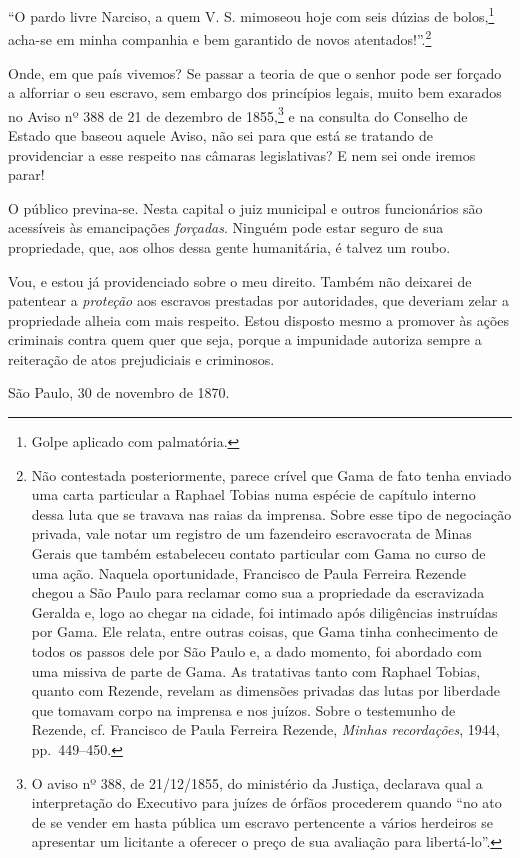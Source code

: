 {``O pardo livre Narciso, a quem V. S. mimoseou hoje com seis dúzias de
bolos,\footnote{ Golpe aplicado com palmatória.} acha-se em minha
companhia e bem garantido de novos atentados!''.\footnote{ Não
  contestada posteriormente, parece crível que Gama de fato tenha
  enviado uma carta particular a Raphael Tobias numa espécie de capítulo
  interno dessa luta que se travava nas raias da imprensa. Sobre esse
  tipo de negociação privada, vale notar um registro de um fazendeiro
  escravocrata de Minas Gerais que também estabeleceu contato particular
  com Gama no curso de uma ação. Naquela oportunidade, Francisco de
  Paula Ferreira Rezende chegou a São Paulo para reclamar como sua a
  propriedade da escravizada Geralda e, logo ao chegar na cidade, foi
  intimado após diligências instruídas por Gama. Ele relata, entre
  outras coisas, que Gama tinha conhecimento de todos os passos dele por
  São Paulo e, a dado momento, foi abordado com uma missiva de parte de
  Gama. As tratativas tanto com Raphael Tobias, quanto com Rezende,
  revelam as dimensões privadas das lutas por liberdade que tomavam
  corpo na imprensa e nos juízos. Sobre o testemunho de Rezende, cf.
  Francisco de Paula Ferreira Rezende, \emph{Minhas recordações}, 1944,
  pp.~449--450.}

Onde, em que país vivemos? Se passar a teoria de que o senhor pode ser
forçado a alforriar o seu escravo, sem embargo dos princípios legais,
muito bem exarados no Aviso nº 388 de 21 de dezembro de 1855,\footnote{
  O aviso nº 388, de 21/12/1855, do ministério da Justiça, declarava
  qual a interpretação do Executivo para juízes de órfãos procederem
  quando ``no ato de se vender em hasta pública um escravo pertencente a
  vários herdeiros se apresentar um licitante a oferecer o preço de sua
  avaliação para libertá-lo''.} e na consulta do Conselho de Estado que
baseou aquele Aviso, não sei para que está se tratando de providenciar a
esse respeito nas câmaras legislativas? E nem sei onde iremos parar!

O público previna-se. Nesta capital o juiz municipal e outros
funcionários são acessíveis às emancipações \emph{forçadas}. Ninguém
pode estar seguro de sua propriedade, que, aos olhos dessa gente
humanitária, é talvez um roubo.

Vou, e estou já providenciado sobre o meu direito. Também não deixarei
de patentear a \emph{proteção} aos escravos prestadas por autoridades,
que deveriam zelar a propriedade alheia com mais respeito. Estou
disposto mesmo a promover às ações criminais contra quem quer que seja,
porque a impunidade autoriza sempre a reiteração de atos prejudiciais e
criminosos.
\begin{flushright}
São Paulo, 30 de novembro de 1870.


\end{flushright}}
